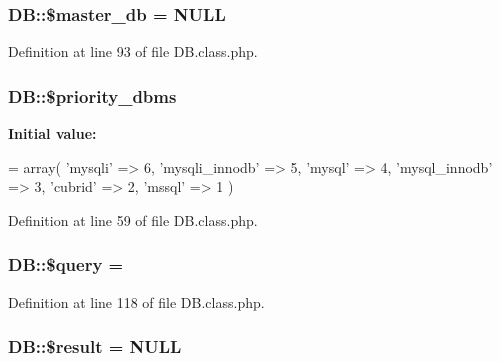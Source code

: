 \subsubsection[{\$master\+\_\+db}]{\setlength{\rightskip}{0pt plus 5cm}D\+B\+::\$master\+\_\+db = N\+U\+L\+L}\label{classDB_ad0a3ae175a659516131cfc6cd615d15c}


Definition at line 93 of file D\+B.\+class.\+php.

\hypertarget{classDB_a082292b9ca3855cbddd3a74e9490ca82}{}
\subsubsection[{\$priority\+\_\+dbms}]{\setlength{\rightskip}{0pt plus 5cm}D\+B\+::\$priority\+\_\+dbms}\label{classDB_a082292b9ca3855cbddd3a74e9490ca82}
{\bfseries Initial value\+:}
\begin{DoxyCode}
= array(
        \textcolor{stringliteral}{'mysqli'} => 6,
        \textcolor{stringliteral}{'mysqli\_innodb'} => 5,
        \textcolor{stringliteral}{'mysql'} => 4,
        \textcolor{stringliteral}{'mysql\_innodb'} => 3,
        \textcolor{stringliteral}{'cubrid'} => 2,
        \textcolor{stringliteral}{'mssql'} => 1
    )
\end{DoxyCode}


Definition at line 59 of file D\+B.\+class.\+php.

\hypertarget{classDB_a32ebabea908efd805a83db48fec3ab52}{}
\subsubsection[{\$query}]{\setlength{\rightskip}{0pt plus 5cm}D\+B\+::\$query = \textquotesingle{}\textquotesingle{}}\label{classDB_a32ebabea908efd805a83db48fec3ab52}


Definition at line 118 of file D\+B.\+class.\+php.

\hypertarget{classDB_a74e74ee9d3311aa1e8107b8accd05e29}{}
\subsubsection[{\$result}]{\setlength{\rightskip}{0pt plus 5cm}D\+B\+::\$result = N\+U\+L\+L}\label{classDB_a74e74ee9d3311aa1e8107b8accd05e29}


